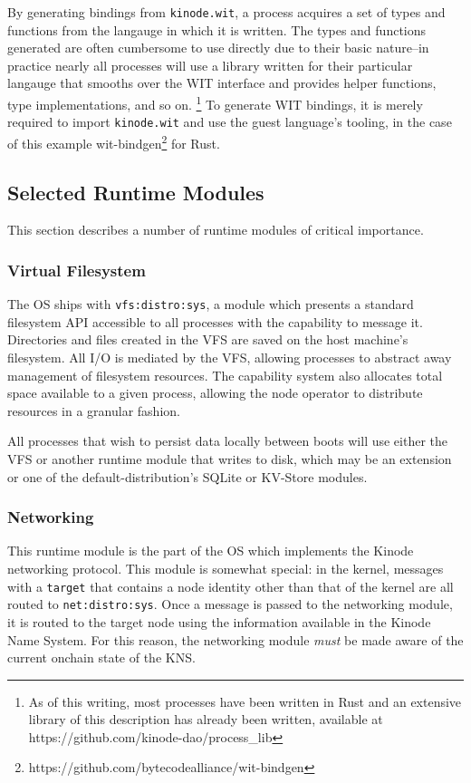 \documentclass[runningheads]{llncs}
\begin{document}
By generating bindings from \verb|kinode.wit|, a process acquires a set of types and functions from the langauge in which it is written.
The types and functions generated are often cumbersome to use directly due to their basic nature–in practice nearly all processes will use a library written for their particular langauge that smooths over the WIT interface and provides helper functions, type implementations, and so on.
\footnote{ As of this writing, most processes have been written in Rust and an extensive library of this description has already been written, available at https://github.com/kinode-dao/process\_lib }
To generate WIT bindings, it is merely required to import \verb|kinode.wit| and use the guest language's tooling, in the case of this example wit-bindgen\footnote{https://github.com/bytecodealliance/wit-bindgen} for Rust.

\subsection{Selected Runtime Modules}
\label{sec:osmodules}

This section describes a number of runtime modules of critical importance.

\subsubsection{Virtual Filesystem}
\label{sec:osvfs}

The OS ships with \verb|vfs:distro:sys|, a module which presents a standard filesystem API accessible to all processes with the capability to message it.
Directories and files created in the VFS are saved on the host machine's filesystem.
All I/O is mediated by the VFS, allowing processes to abstract away management of filesystem resources.
The capability system also allocates total space available to a given process, allowing the node operator to distribute resources in a granular fashion.

All processes that wish to persist data locally between boots will use either the VFS or another runtime module that writes to disk, which may be an extension or one of the default-distribution's SQLite or KV-Store modules.

\subsubsection{Networking}
\label{sec:osnetworking}

This runtime module is the part of the OS which implements the Kinode networking protocol.
This module is somewhat special: in the kernel, messages with a \verb|target| that contains a node identity other than that of the kernel are all routed to \verb|net:distro:sys|.
Once a message is passed to the networking module, it is routed to the target node using the information available in the Kinode Name System.
For this reason, the networking module \textit{must} be made aware of the current onchain state of the KNS.
\end{document}
